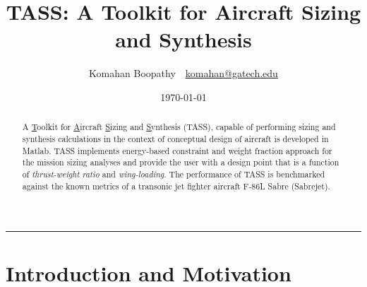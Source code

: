 \documentclass[pdftex,11pt,letter]{article}
\title{\textbf{\textsc{TASS}: A Toolkit for Aircraft Sizing and Synthesis}}
\author{Komahan Boopathy~~\url{komahan@gatech.edu}} \date{\today}
\begin{document}
\maketitle
\vspace{-0.25in}
\rule{\linewidth}{2pt}

\begin{abstract}
A  \ul{T}oolkit for \ul{A}ircraft \ul{S}izing and \ul{S}ynthesis (TASS), capable of performing sizing and synthesis calculations  in the context of conceptual design of aircraft is developed in Matlab\cite{MATLAB}. TASS implements energy-based constraint and weight fraction approach for the mission sizing analyses and provide the user with a design point that is a function of \emph{thrust-weight ratio} and \emph{wing-loading}.  The performance of TASS is benchmarked against the known metrics of a transonic jet fighter aircraft F-86L Sabre (Sabrejet).
\end{abstract}

\section{Introduction and Motivation}
\end{document}
